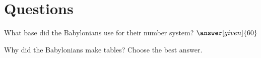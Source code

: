 \documentclass{ximera}
\begin{document}
\section{Questions}

\begin{question}
What base did the Babylonians use for their number system? $\answer[given]{60}$
\end{question}

\begin{question}
Why did the Babylonians make tables?  Choose the best answer.
\begin{multipleChoice}
\end{multipleChoice}
\end{question}



\end{document}
